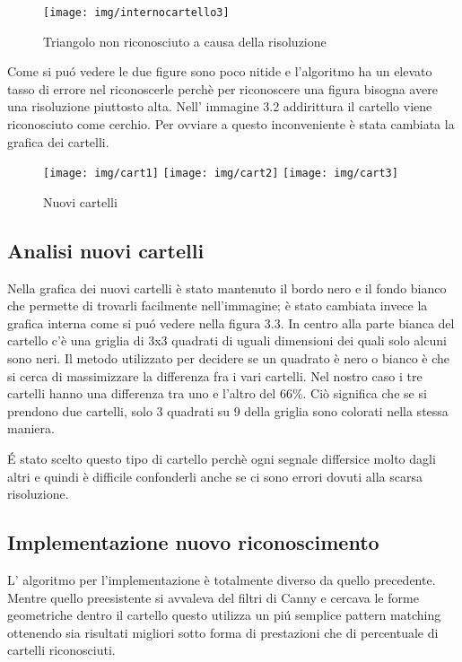 		\begin{figure}[!ht]
			\centering
			\texttt{[image: img/internocartello3]}
			\caption[Triangolo con poca risoluzione]{Triangolo non riconosciuto a causa della risoluzione}
		\end{figure}

		Come si pu\'o vedere le due figure sono poco nitide e l'algoritmo ha un elevato tasso di errore nel riconoscerle perchè per riconoscere una figura bisogna avere una risoluzione piuttosto alta. Nell' immagine 3.2 addirittura il cartello viene riconosciuto come cerchio.
		Per ovviare a questo inconveniente è stata cambiata la grafica dei cartelli.
		\begin{figure}[!ht]
			\centering
			\texttt{[image: img/cart1]}
			\texttt{[image: img/cart2]}
			\texttt{[image: img/cart3]}
			\caption{Nuovi cartelli}
		\end{figure}

	\subsection{Analisi nuovi cartelli}
		Nella grafica dei nuovi cartelli è stato mantenuto il bordo nero e il fondo bianco che permette di trovarli facilmente nell'immagine; è stato cambiata invece la grafica interna come si pu\'o vedere nella figura 3.3. In centro alla parte bianca del cartello c'è una griglia di 3x3  quadrati di uguali dimensioni dei quali solo alcuni sono neri. Il metodo utilizzato per decidere se un quadrato è nero o bianco è che si cerca di massimizzare la differenza fra i vari cartelli. Nel nostro caso i tre cartelli hanno una differenza tra uno e l'altro del 66\%. Ciò significa che se si prendono due cartelli, solo 3 quadrati su 9 della griglia sono colorati nella stessa maniera.
		
		\'E stato scelto questo tipo di cartello perchè ogni segnale differsice molto dagli altri e quindi è difficile confonderli anche se ci sono errori dovuti alla scarsa risoluzione.

	\subsection{Implementazione nuovo riconoscimento}
		L' algoritmo per l'implementazione è totalmente diverso da quello precedente. Mentre quello preesistente si avvaleva del filtri di Canny e cercava le forme geometriche dentro il cartello questo utilizza un pi\'u semplice pattern matching ottenendo sia risultati migliori sotto forma di prestazioni che di percentuale di cartelli riconosciuti.\newline

